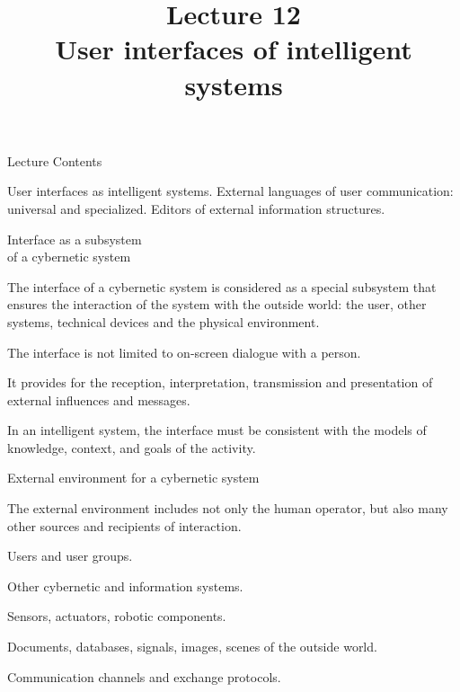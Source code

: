 \title{Lecture 12\\User interfaces of intelligent systems \vspace{-2em}}

\begin{frame}
	\titlepage
\end{frame}

\begin{frame}{Lecture Contents}
	\topline
	\justifying
	
	
	User interfaces as intelligent systems. External languages of user communication: universal and specialized. Editors of external information structures.
	
\end{frame}

\begin{frame}{Interface as a subsystem\\ of a cybernetic system}
	\topline
	\justifying
	
	The interface of a cybernetic system is considered as a special subsystem that ensures the interaction of the system with the outside world: the user, other systems, technical devices and the physical environment.
	
	\begin{textitemize}
		\item The interface is not limited to on-screen dialogue with a person.
		\item It provides for the reception, interpretation, transmission and presentation of external influences and messages.
		\item In an intelligent system, the interface must be consistent with the models of knowledge, context, and goals of the activity.
	\end{textitemize}
\end{frame}

\begin{frame}{External environment for a cybernetic system}
	\topline
	\justifying
	
	
	The external environment includes not only the human operator, but also many other sources and recipients of interaction.
	
	\begin{textitemize}
		\item Users and user groups.
		\item Other cybernetic and information systems.
		\item Sensors, actuators, robotic components.
		\item Documents, databases, signals, images, scenes of the outside world.
		\item Communication channels and exchange protocols.
	\end{textitemize}
\end{frame}

